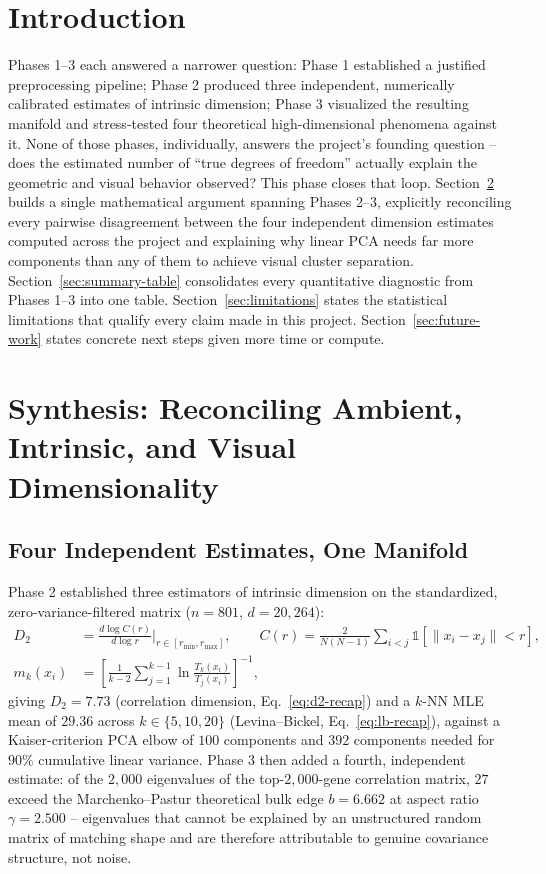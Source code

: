 \documentclass[11pt]{article}
\begin{document}
\section{Introduction}

Phases 1--3 each answered a narrower question: Phase 1 established a
justified preprocessing pipeline; Phase 2 produced three independent,
numerically calibrated estimates of intrinsic dimension; Phase 3 visualized
the resulting manifold and stress-tested four theoretical high-dimensional
phenomena against it. None of those phases, individually, answers the
project's founding question -- does the estimated number of ``true degrees
of freedom'' actually explain the geometric and visual behavior observed?
This phase closes that loop. Section~\ref{sec:synthesis} builds a single
mathematical argument spanning Phases 2--3, explicitly reconciling every
pairwise disagreement between the four independent dimension estimates
computed across the project and explaining why linear PCA needs far more
components than any of them to achieve visual cluster separation.
Section~\ref{sec:summary-table} consolidates every quantitative diagnostic
from Phases 1--3 into one table. Section~\ref{sec:limitations} states the
statistical limitations that qualify every claim made in this project.
Section~\ref{sec:future-work} states concrete next steps given more time or
compute.

\section{Synthesis: Reconciling Ambient, Intrinsic, and Visual Dimensionality}
\label{sec:synthesis}

\subsection{Four Independent Estimates, One Manifold}

Phase 2 established three estimators of intrinsic dimension on the
standardized, zero-variance-filtered matrix ($n=801$, $d=20{,}264$):
\begin{align}
D_2 &= \frac{d \log C(r)}{d \log r}\bigg|_{r \in [r_{\min}, r_{\max}]},
\qquad C(r) = \frac{2}{N(N-1)} \sum_{i<j} \mathbb{1}\left[\lVert x_i - x_j \rVert < r\right],
\label{eq:d2-recap}\\
m_k(x_i) &= \left[\frac{1}{k-2}\sum_{j=1}^{k-1} \ln\frac{T_k(x_i)}{T_j(x_i)}\right]^{-1},
\label{eq:lb-recap}
\end{align}
giving $D_2 = 7.73$ (correlation dimension, Eq.~\ref{eq:d2-recap}) and a
$k$-NN MLE mean of $29.36$ across $k \in \{5,10,20\}$ (Levina--Bickel,
Eq.~\ref{eq:lb-recap}), against a Kaiser-criterion PCA elbow of $100$
components and $392$ components needed for $90\%$ cumulative linear
variance. Phase 3 then added a fourth, independent estimate: of the
$2{,}000$ eigenvalues of the top-$2{,}000$-gene correlation matrix, $27$
exceed the Marchenko--Pastur theoretical bulk edge $b = 6.662$ at aspect
ratio $\gamma = 2.500$ -- eigenvalues that cannot be explained by an
unstructured random matrix of matching shape and are therefore attributable
to genuine covariance structure, not noise.
\end{document}
